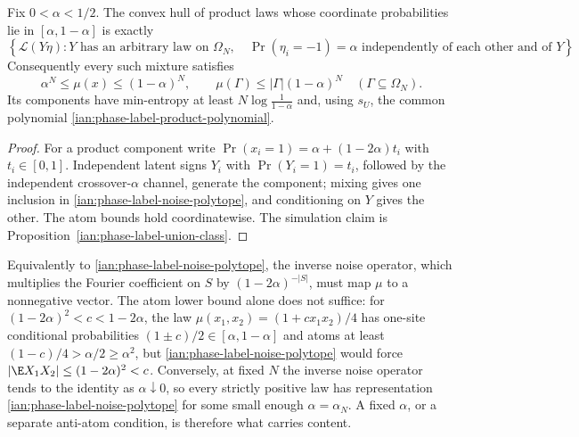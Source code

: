 \begin{proposition}
\label{ian:phase-label-bounded-products}
Fix \(0<\alpha<1/2\). The convex hull of product laws whose coordinate
probabilities lie in \([\alpha,1-\alpha]\) is exactly
\[
 \left\{\mathcal L(Y\eta):
     Y\text{ has an arbitrary law on }\Omega_N,\quad
     \Pr(\eta_i=-1)=\alpha\text{ independently of each other and of }Y\right\}.
 \tag{19.3}\label{ian:phase-label-noise-polytope}
\]
Consequently every such mixture satisfies
\[
 \alpha^N\le\mu(x)\le(1-\alpha)^N,
 \qquad
 \mu(\Gamma)\le |\Gamma|(1-\alpha)^N\quad(\Gamma\subseteq\Omega_N).
 \tag{19.4}\label{ian:phase-label-product-mass-bound}
\]
Its components have min-entropy at least \(N\log\frac1{1-\alpha}\) and,
using \(s_U\), the common polynomial
\eqref{ian:phase-label-product-polynomial}.
\end{proposition}

\begin{proof}
For a product component write \(\Pr(x_i=1)=\alpha+(1-2\alpha)t_i\) with
\(t_i\in[0,1]\). Independent latent signs \(Y_i\) with
\(\Pr(Y_i=1)=t_i\), followed by the independent crossover-\(\alpha\)
channel, generate the component; mixing gives one inclusion in
\eqref{ian:phase-label-noise-polytope}, and conditioning on \(Y\) gives
the other. The atom bounds hold coordinatewise. The simulation claim is
Proposition~\ref{ian:phase-label-union-class}.
\end{proof}

\begin{remark}
\label{ian:phase-label-bias-bound-remark}
Equivalently to \eqref{ian:phase-label-noise-polytope}, the inverse noise
operator, which multiplies the Fourier coefficient on \(S\) by
\((1-2\alpha)^{-|S|}\), must map \(\mu\) to a nonnegative vector. The
atom lower bound alone does not suffice: for
\((1-2\alpha)^2<c<1-2\alpha\), the law \(\mu(x_1,x_2)=(1+cx_1x_2)/4\)
has one-site conditional probabilities \((1\pm c)/2\in[\alpha,1-\alpha]\)
and atoms at least \((1-c)/4>\alpha/2\ge\alpha^2\), but
\eqref{ian:phase-label-noise-polytope} would force
\(|\E X_1X_2|\le(1-2\alpha)^2<c\). Conversely, at fixed \(N\) the inverse
noise operator tends to the identity as \(\alpha\downarrow0\), so every
strictly positive law has representation
\eqref{ian:phase-label-noise-polytope} for some small enough
\(\alpha=\alpha_N\). A fixed \(\alpha\), or a separate anti-atom
condition, is therefore what carries content.
\end{remark}

